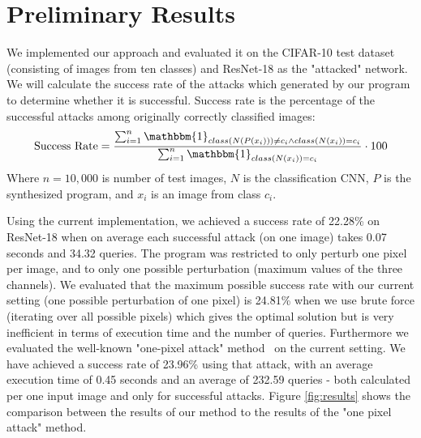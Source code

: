 \documentclass[11pt]{article}
\begin{document}
\section{Preliminary Results}
We implemented our approach and evaluated it on the CIFAR-10 test dataset (consisting of images from ten classes) and ResNet-18 as the "attacked" network. We will calculate the success rate of the attacks which generated by our program to determine whether it is successful. Success rate is the percentage of the successful attacks among originally correctly classified images:
\begin{equation*}
\text{Success Rate}= \frac{\sum_{i=1}^n \mathbbm{1}_{class(N(P(x_i)))\neq c_i \land class(N(x_i))= c_i}}{\sum_{i=1}^n \mathbbm{1}_{class(N(x_i))=c_i}} \cdot 100
\end{equation*}
Where $n=10,000$ is number of test images, $N$ is the classification CNN, $P$ is the synthesized program, and $x_i$ is an image from class $c_i$.

Using the current implementation, we achieved a success rate of 22.28\% on ResNet-18 when on average each successful attack (on one image) takes 0.07 seconds and 34.32 queries. The program was restricted to only perturb one pixel per image, and to only one possible perturbation (maximum values of the three channels). We evaluated that the maximum possible success rate with our current setting (one possible perturbation of one pixel) is 24.81\% when we use brute force (iterating over all possible pixels) which gives the optimal solution but is very inefficient in terms of execution time and the number of queries. Furthermore we evaluated the well-known "one-pixel attack" method~\cite{OnePixelAttack} on the current setting. We have achieved a success rate of 23.96\% using that attack, with an average execution time of 0.45 seconds and an average of 232.59 queries - both calculated per one input image and only for successful attacks. Figure \ref{fig:results} shows the comparison between the results of our method to the results of the "one pixel attack" method. 
\end{document}
